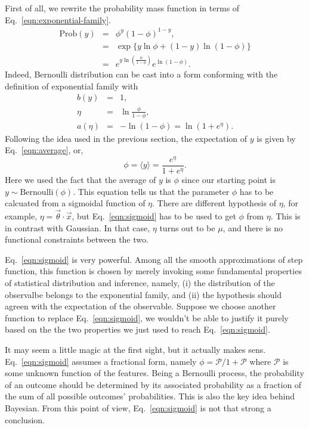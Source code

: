 First of all, we rewrite the probability mass function in terms of Eq.~\ref{eqn:exponential-family}.
\begin{eqnarray}
	\text{Prob}(y) &=& \phi^y(1-\phi)^{1-y},\\
		     &=& \exp\{y\ln\phi + (1-y)\ln(1-\phi)\}\\
	      &=&e^{y\ln\left(\frac{\phi}{1-\phi}\right)}e^{\ln(1-\phi)}.
\end{eqnarray}
Indeed, Bernoulli distribution can be cast into a form conforming with the definition of exponential family with
\begin{eqnarray}
	b(y) &=& 1,\\
	\eta &=& \ln\frac{\phi}{1-\phi},\\\label{eqn:logit}
	a(\eta) &=& -\ln(1-\phi) = \ln\left(1+e^\eta\right).\label{eqn:BernoulliLogP}
\end{eqnarray}
Following the idea used in the previous section, the expectation of $y$ is given by Eq.~\ref{eqn:average}, or,
\begin{equation}
	\phi = \langle y\rangle = \frac{e^\eta}{1+e^\eta}.\label{eqn:sigmoid}
\end{equation}
Here we used the fact that the average of $y$ is $\phi$ since our starting point is $y\sim\text{Bernoulli}(\phi)$. This equation tells us that the parameter $\phi$ has to be calcuated from a sigmoidal function of $\eta$. There are different hypothesis of $\eta$, for example, $\eta = \vec\theta\cdot\vec x$, but Eq.~\ref{eqn:sigmoid} has to be used to get $\phi$ from $\eta$. This is in contrast with Gaussian. In that case, $\eta$ turns out to be $\mu$, and there is no functional constraints between the two.

Eq.~\ref{eqn:sigmoid} is very powerful. Among all the smooth approximations of step function, this function is chosen by merely invoking some fundamental properties of statistical distribution and inference, namely, (i) the distribution of the observalbe belongs to the exponential family, and (ii) the hypothesis should agreen with the expectation of the observable. Suppose we choose another function to replace Eq.~\ref{eqn:sigmoid}, we wouldn't be able to justify it purely based on the the two properties we just used to reach Eq.~\ref{eqn:sigmoid}.

It may seem a little magic at the first sight, but it actually makes sens. Eq.~\ref{eqn:sigmoid} assumes a fractional form, namely $\phi = \mathcal P/1 + \mathcal P$ where $\mathcal P$ is some unknown function of the features. Being a Bernoulli process, the probability of an outcome should be determined by its associated probability as a fraction of the sum of all possible outcomes' probabilities. This is also the key idea behind Bayesian. From this point of view, Eq.~\ref{eqn:sigmoid} is not that strong a conclusion.
